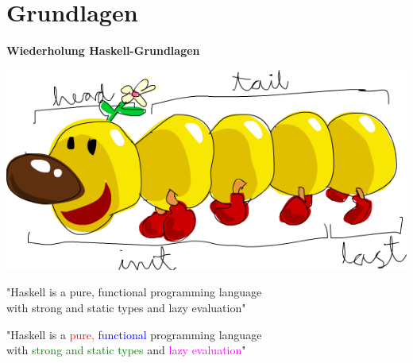 \documentclass[unknownkeysallowed]{beamer}
\begin{document}

\section{Grundlagen}
\begin{frame}
\begin{center}
\Large\textbf{Wiederholung Haskell-Grundlagen} \bigskip

\includegraphics[scale=0.35]{listmonster.png} 
\end{center}
\end{frame}


\begin{frame}
\begin{center}

  "Haskell is a pure, functional programming language\\with strong and static types
  and lazy evaluation"
  
\end{center}
\end{frame}


\begin{frame}
\begin{center}

  "Haskell is a \textcolor{red}{pure,} \textcolor{blue}{functional} programming language \\ with \textcolor{green}{strong and static types} and \textcolor{magenta}{lazy evaluation}"
  
\end{center}
\end{frame}
  
\end{document}

